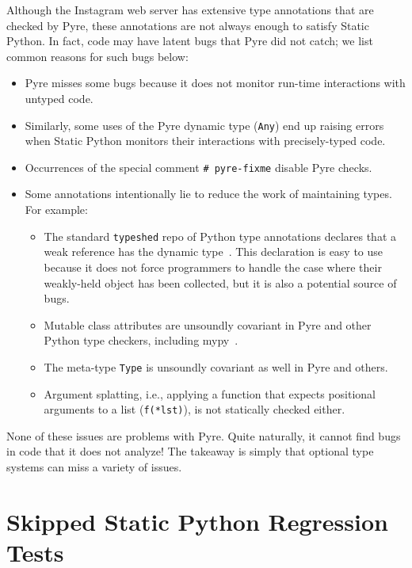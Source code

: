 \documentclass[english,cleveref,crc]{programming}
\newcommand{\SP}{Static Python}
\newcommand{\code}[1]{\texttt{#1}}
\begin{document}
Although the Instagram web server has extensive type annotations that are
checked by Pyre,
these annotations are not always enough to satisfy \SP{}.
In fact, code may have latent bugs that Pyre did not catch;
we list common reasons for such bugs below:

\begin{itemize}
  \item
    Pyre misses some bugs because it does not monitor run-time interactions
    with untyped code.

  \item
    Similarly, some uses of the Pyre dynamic type (\code{Any}) end up
    raising errors when \SP{} monitors their interactions with precisely-typed code.

  \item
    Occurrences of the special comment \lstinline$# pyre-fixme$ disable Pyre checks.

  \item
    Some annotations intentionally lie to reduce the work of maintaining types.
    For example:

    \begin{itemize}
      \item
        The standard \code{typeshed} repo of Python type annotations declares
        that a weak reference has the dynamic type~\cite{typeshed}.
        This declaration is easy to use because it does not force programmers
        to handle the case where their weakly-held object has been collected,
        but it is also a potential source of bugs.
      \item
        Mutable class attributes are unsoundly covariant in Pyre and other
        Python type checkers, including mypy~\cite{mypy}.
      \item
        The meta-type \code{Type} is unsoundly covariant as well in Pyre
        and others.
      \item
        Argument splatting, i.e., applying a function that expects positional
        arguments to a list (\code{f(*lst)}), is not statically checked
        either.
    \end{itemize}

\end{itemize}

None of these issues are problems with Pyre.
Quite naturally, it cannot find bugs in code that it does not analyze!
The takeaway is simply that optional type systems can miss a variety of issues.


\section{Skipped \SP{} Regression Tests}
\label{a:banned-test}
\end{document}
